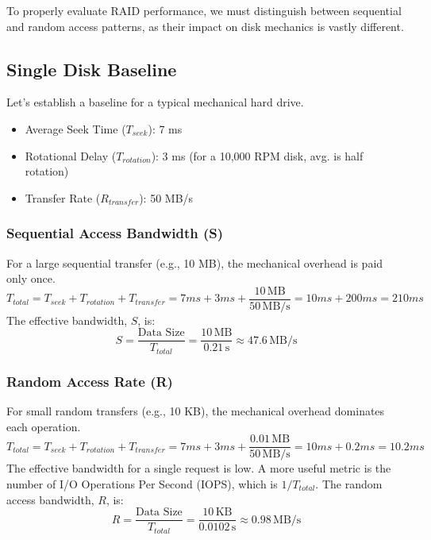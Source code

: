 \documentclass[12pt]{article}
\begin{document}
To properly evaluate RAID performance, we must distinguish between sequential and random access patterns, as their impact on disk mechanics is vastly different.

\subsection{Single Disk Baseline}

Let's establish a baseline for a typical mechanical hard drive.
\begin{itemize}
    \item Average Seek Time ($T_{seek}$): 7 ms
    \item Rotational Delay ($T_{rotation}$): 3 ms (for a 10,000 RPM disk, avg. is half rotation)
    \item Transfer Rate ($R_{transfer}$): 50 MB/s
\end{itemize}

\subsubsection{Sequential Access Bandwidth (S)}
For a large sequential transfer (e.g., 10 MB), the mechanical overhead is paid only once.
\begin{equation}
    T_{total} = T_{seek} + T_{rotation} + T_{transfer} = 7ms + 3ms + \frac{10 \, \text{MB}}{50 \, \text{MB/s}} = 10ms + 200ms = 210ms
\end{equation}
The effective bandwidth, $S$, is:
\begin{equation}
    S = \frac{\text{Data Size}}{T_{total}} = \frac{10 \, \text{MB}}{0.21 \, \text{s}} \approx 47.6 \, \text{MB/s}
\end{equation}

\subsubsection{Random Access Rate (R)}
For small random transfers (e.g., 10 KB), the mechanical overhead dominates each operation.
\begin{equation}
    T_{total} = T_{seek} + T_{rotation} + T_{transfer} = 7ms + 3ms + \frac{0.01 \, \text{MB}}{50 \, \text{MB/s}} = 10ms + 0.2ms = 10.2ms
\end{equation}
The effective bandwidth for a single request is low. A more useful metric is the number of I/O Operations Per Second (IOPS), which is $1/T_{total}$. The random access bandwidth, $R$, is:
\begin{equation}
    R = \frac{\text{Data Size}}{T_{total}} = \frac{10 \, \text{KB}}{0.0102 \, \text{s}} \approx 0.98 \, \text{MB/s}
\end{equation}
\end{document}
